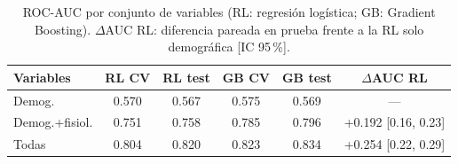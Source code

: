 \begin{table}[!t]
\centering
\scriptsize
\caption{ROC-AUC por conjunto de variables (RL: regresión logística; GB: Gradient Boosting). $\Delta$AUC RL: diferencia pareada en prueba frente a la RL solo demográfica [IC 95\,\%].}
\label{tab:ablation}
\setlength{\tabcolsep}{4pt}
\begin{tabular}{lccccc}
\toprule
Variables & RL CV & RL test & GB CV & GB test & $\Delta$AUC RL \\
\midrule
Demog. & 0.570 & 0.567 & 0.575 & 0.569 & --- \\
Demog.+fisiol. & 0.751 & 0.758 & 0.785 & 0.796 & +0.192 [0.16, 0.23] \\
Todas & 0.804 & 0.820 & 0.823 & 0.834 & +0.254 [0.22, 0.29] \\
\bottomrule
\end{tabular}
\end{table}
